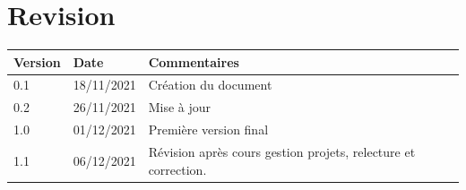 \documentclass[a4paper, twoside, 12pt]{report}
\title{\titleOfDoc}
\author{\authors}
\begin{document}


\chapter*{Revision}
\begin{table}[!ht] %
	\begin{tabular}{ | m{3cm} | m{3cm}| m{8cm} | } 
		\hline
		\textbf{Version} & \textbf{Date} & \textbf{Commentaires} \\
		\hline
			0.1 & 18/11/2021 & Création du document\\
		\hline
			0.2 & 26/11/2021 & Mise à jour\\
		\hline
			1.0 & 01/12/2021  & Première version final\\
		\hline
            1.1 & 06/12/2021 & Révision après cours gestion projets, relecture et correction.\\
        \hline
	\end{tabular}
\end{table}

\tableofcontents
\newpage



%
%
\printbibliography[title=Réferences externes]
\end{document}
